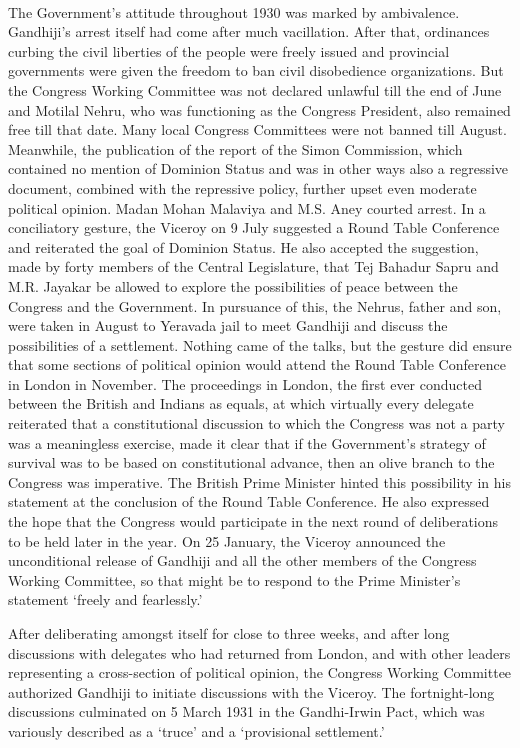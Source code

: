 \begin{multicols}{2}
\paragraph*{}
The Government's attitude throughout 1930 was marked by ambivalence. Gandhiji's arrest itself had come after much vacillation. After that, ordinances curbing the civil liberties of the people were freely issued and provincial governments were given the freedom to ban civil disobedience organizations. But the Congress Working Committee was not declared unlawful till the end of June and Motilal Nehru, who was functioning as the Congress President, also remained free till that date. Many local Congress Committees were not banned till August. Meanwhile, the publication of the report of the Simon Commission, which contained no mention of Dominion Status and was in other ways also a regressive document, combined with the repressive policy, further upset even moderate political opinion. Madan Mohan Malaviya and M.S. Aney courted arrest. In a conciliatory gesture, the Viceroy on 9 July suggested a Round Table Conference and reiterated the goal of Dominion Status. He also accepted the suggestion, made by forty members of the Central Legislature, that Tej Bahadur Sapru and M.R. Jayakar be allowed to explore the possibilities of peace between the Congress and the Government. In pursuance of this, the Nehrus, father and son, were taken in August to Yeravada jail to meet Gandhiji and discuss the possibilities of a settlement. Nothing came of the talks, but the gesture did ensure that some sections of political opinion would attend the Round Table Conference in London in November. The proceedings in London, the first ever conducted between the British and Indians as equals, at which virtually every delegate reiterated that a constitutional discussion to which the Congress was not a party was a meaningless exercise, made it clear that if the Government's strategy of survival was to be based on constitutional advance, then an olive branch to the Congress was imperative. The British Prime Minister hinted this possibility in his statement at the conclusion of the Round Table Conference. He also expressed the hope that the Congress would participate in the next round of deliberations to be held later in the year. On 25 January, the Viceroy announced the unconditional release of Gandhiji and all the other members of the Congress Working Committee, so that might be to respond to the Prime Minister's statement `freely and fearlessly.'

After deliberating amongst itself for close to three weeks, and after long discussions with delegates who had returned from London, and with other leaders representing a cross-section of political opinion, the Congress Working Committee authorized Gandhiji to initiate discussions with the Viceroy. The fortnight-long discussions culminated on 5 March 1931 in the Gandhi-Irwin Pact, which was variously described as a `truce' and a `provisional settlement.'


\end{multicols}
